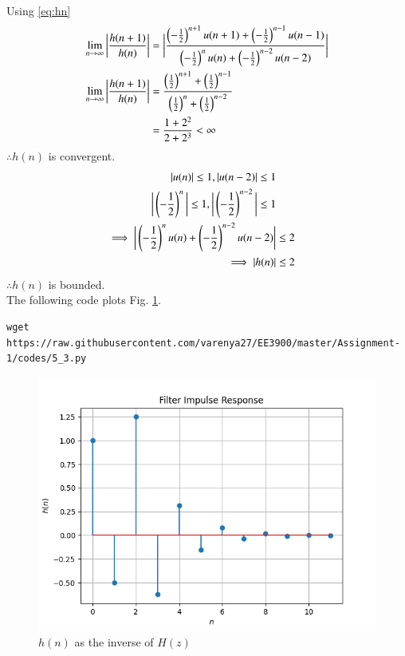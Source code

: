 \documentclass[journal,12pt,twocolumn]{IEEEtran}
\renewcommand\thesection{\arabic{section}}
\begin{document}
\begin{enumerate}[label=\thesection.\arabic*]
\\
\solution 
Using \eqref{eq:hn}
\begin{align}
    \lim_{n \rightarrow{}\infty}\bigg| \frac{h(n+1)}{h(n)}\bigg|&=\bigg|\frac{\left(-\frac{1}{2}\right)^{n+1}u(n+1) + \left(-\frac{1}{2}\right)^{n-1}u(n-1)}{\left(-\frac{1}{2}\right)^{n}u(n) + \left(-\frac{1}{2}\right)^{n-2}u(n-2)}\bigg|\\
    \lim_{n \rightarrow{}\infty} \bigg| \frac{h(n+1)}{h(n)}\bigg|&= \frac{\left(\frac{1}{2}\right)^{n+1} + \left(\frac{1}{2}\right)^{n-1}}{\left(\frac{1}{2}\right)^{n} + \left(\frac{1}{2}\right)^{n-2}}\\
    &= \frac{1+2^{2}}{2+2^3}<\infty
\end{align}
$\therefore h(n)$ is convergent.\\
\begin{align*}
    |u(n)|\leq1, |u(n-2)|\leq1\\
    \bigg|\left(-\frac{1}{2}\right)^n \bigg|\leq1,\bigg|\left(-\frac{1}{2}\right)^{n-2} \bigg|\leq1\\ 
    \implies \bigg|\left(-\frac{1}{2}\right)^{n}u(n) + \left(-\frac{1}{2}\right)^{n-2}u(n-2)\bigg|&\leq2\\
    \implies |h(n)|&\leq2
\end{align*}
$\therefore h(n)$ is bounded.\\
The following code plots Fig. \ref{fig:hn}.
\begin{lstlisting}
wget https://raw.githubusercontent.com/varenya27/EE3900/master/Assignment-1/codes/5_3.py
\end{lstlisting}
\begin{figure}[!ht]
\centering
\includegraphics[width=\columnwidth]{figures/Figure_3.png}
\caption{$h(n)$ as the inverse of $H(z)$}
\label{fig:hn}
\end{figure}


\end{enumerate}
\end{document}
